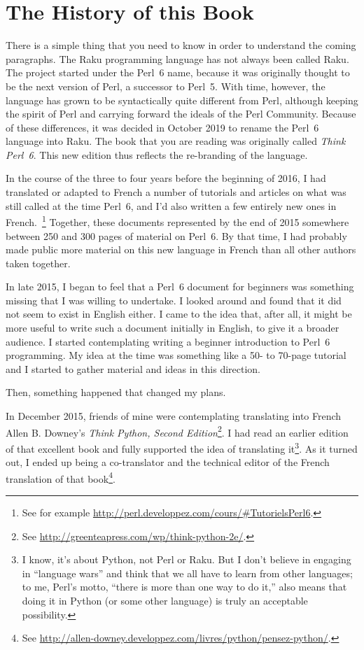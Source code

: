 \section*{The History of this Book}

There is a simple thing that you need to know in order to 
understand the coming paragraphs. The Raku programming language 
has not always been called Raku. The project started under the 
Perl~6 name, because it was originally thought to be the next version 
of Perl, a successor to Perl~5. With time, however, the language 
has grown to be syntactically quite different from Perl, although 
keeping the spirit of Perl and carrying forward the ideals of 
the Perl Community. Because of these differences, it was decided 
in October 2019 to rename the Perl~6 language into Raku. The book 
that you are reading was originally called \emph{Think Perl~6}. 
This new edition thus reflects the re-branding of the language.

In the course of the three to four years before the beginning of 2016, I  
had translated or adapted to French a number of tutorials 
and articles on what was still called at the time Perl~6, and 
I'd also written a few entirely 
new ones in French.~\footnote{See for example 
\url{http://perl.developpez.com/cours/\#TutorielsPerl6}.} 
Together, these documents represented by the end of 2015 
somewhere between 250 and 300 pages of material on Perl~6. 
By that time, I had 
probably made public more material on this new language in French than 
all other authors taken together.

In late 2015, I began to feel that a Perl~6 document for beginners 
was something missing that I was willing to undertake. 
I looked around and found that it did not seem to 
exist in English either. I came to the idea that, after all, 
it might be more useful to write such a document initially 
in English, to give it a broader audience. I started contemplating 
writing a beginner introduction to Perl~6 
programming. My idea at the time was something like a 50- to 
70-page tutorial and I started to gather material and ideas 
in this direction.

Then, something happened that changed my plans.

In December 2015, friends of mine were contemplating translating 
into French Allen B. Downey's \emph{Think Python, Second Edition}\footnote{See \url{http://greenteapress.com/wp/think-python-2e/}.}. 
I had read an earlier edition of that excellent book and fully supported 
the idea of translating it\footnote{I know, it's 
about Python, not Perl or Raku. But I don't believe in engaging 
in ``language wars'' and think that we all have to learn from 
other languages; to me, Perl's motto, ``there is more than 
one way to do it,'' also means that doing it in Python (or some 
other language) is truly an acceptable possibility.}. As it 
turned out, I ended up being a co-translator and the technical 
editor of the French translation of that book\footnote{See 
\url{http://allen-downey.developpez.com/livres/python/pensez-python/}.}.

